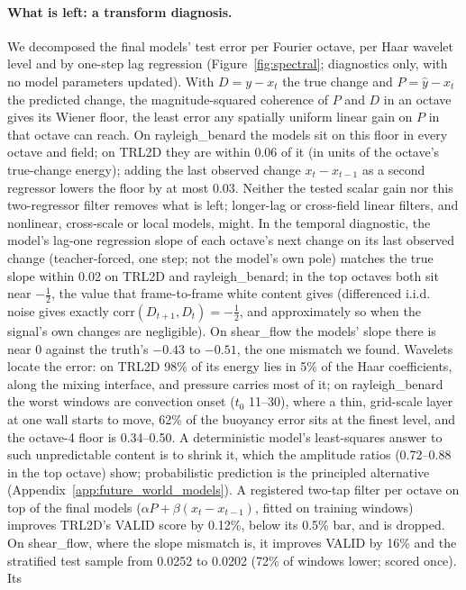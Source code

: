 \documentclass{article}
\begin{document}
\paragraph{What is left: a transform diagnosis.} We decomposed the final models' test error per Fourier octave, per
Haar wavelet level and by one-step lag regression (Figure~\ref{fig:spectral}; diagnostics only, with no model parameters updated). With $D=y-x_t$ the true change and
$P=\hat y-x_t$ the predicted change, the magnitude-squared coherence of $P$ and $D$ in an octave gives its Wiener floor,
the least error any spatially uniform linear gain on $P$ in that octave can reach. On rayleigh\_benard the models sit on
this floor in every octave and field; on TRL2D they are within 0.06 of it (in units of the octave's true-change energy);
adding the last observed change $x_t-x_{t-1}$ as a second regressor lowers the floor by at most 0.03. Neither the
tested scalar gain nor this two-regressor filter removes what is left; longer-lag or cross-field linear filters, and
nonlinear, cross-scale or local models, might. In the temporal diagnostic, the model's lag-one regression slope of each octave's next change on its last observed change (teacher-forced,
one step; not the model's own pole) matches the true slope within 0.02 on TRL2D and rayleigh\_benard; in the
top octaves both sit near $-\tfrac12$, the value that frame-to-frame white content gives (differenced i.i.d. noise gives exactly
$\mathrm{corr}(D_{t+1},D_t)=-\tfrac12$, and approximately so when the signal's own changes are negligible). On shear\_flow the models' slope there is near 0 against the
truth's $-0.43$ to $-0.51$, the one mismatch we found. Wavelets locate the error: on TRL2D 98\% of its energy lies in
5\% of the Haar coefficients, along the mixing interface, and pressure carries most of it; on rayleigh\_benard the worst
windows are convection onset ($t_0$ 11--30), where a thin, grid-scale layer at one wall starts to move, 62\% of the
buoyancy error sits at the finest level, and the octave-4 floor is 0.34--0.50. A deterministic model's least-squares
answer to such unpredictable content is to shrink it, which the amplitude ratios (0.72--0.88 in the top octave) show;
probabilistic prediction is the principled alternative (Appendix~\ref{app:future_world_models}). A registered two-tap
filter per octave on top of the final models ($\alpha P+\beta(x_t-x_{t-1})$, fitted on training windows) improves
TRL2D's VALID score by 0.12\%, below its 0.5\% bar, and is dropped. On shear\_flow, where the slope mismatch is, it
improves VALID by 16\% and the stratified test sample from 0.0252 to 0.0202 (72\% of windows lower; scored once). Its
\end{document}

